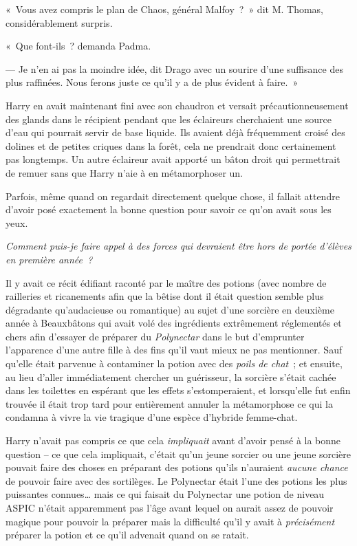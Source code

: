 «~Vous avez compris le plan de Chaos, général Malfoy~?~»
dit M. Thomas, considérablement surpris.

«~Que font-ils~? demanda Padma.

--- Je n'en ai pas la moindre idée, dit Drago avec un sourire d'une suffisance des plus raffinées.
Nous ferons juste ce qu'il y a de plus évident à faire.~»

\later

Harry en avait maintenant fini avec son chaudron et versait précautionneusement des glands dans le récipient pendant que les éclaireurs cherchaient une source d'eau qui pourrait servir de base liquide.
Ils avaient déjà fréquemment croisé des dolines et de petites criques dans la forêt, cela ne prendrait donc certainement pas longtemps.
Un autre éclaireur avait apporté un bâton droit qui permettrait de remuer sans que Harry n'aie à en métamorphoser un.

Parfois, même quand on regardait directement quelque chose, il fallait attendre d'avoir posé exactement la bonne question pour savoir ce qu'on avait sous les yeux.

\emph{Comment puis-je faire appel à des forces qui devraient être hors de portée d'élèves en première année~?}

Il y avait ce récit édifiant raconté par le maître des potions (avec nombre de railleries et ricanements afin que la bêtise dont il était question semble plus dégradante qu'audacieuse ou romantique) au sujet d'une sorcière en deuxième année à Beauxbâtons qui avait volé des ingrédients extrêmement réglementés et chers afin d'essayer de préparer du \emph{Polynectar} dans le but d'emprunter l'apparence d'une autre fille à des fins qu'il vaut mieux ne pas mentionner.
Sauf qu'elle était parvenue à contaminer la potion avec des \emph{poils de chat}~; et ensuite, au lieu d'aller immédiatement chercher un guérisseur, la sorcière s'était cachée dans les toilettes en espérant que les effets s'estomperaient, et lorsqu'elle fut enfin trouvée il était trop tard pour entièrement annuler la métamorphose ce qui la condamna à vivre la vie tragique d'une espèce d'hybride femme-chat.

Harry n'avait pas compris ce que cela \emph{impliquait} avant d'avoir pensé à la bonne question -- ce que cela impliquait, c'était qu'un jeune sorcier ou une jeune sorcière pouvait faire des choses en préparant des potions qu'ils n'auraient \emph{aucune chance} de pouvoir faire avec des sortilèges.
Le Polynectar était l'une des potions les plus puissantes connues… mais ce qui faisait du Polynectar une potion de niveau ASPIC n'était apparemment pas l'âge avant lequel on aurait assez de pouvoir magique pour pouvoir la préparer mais la difficulté qu'il y avait à \emph{précisément} préparer la potion et ce qu'il advenait quand on se ratait.

